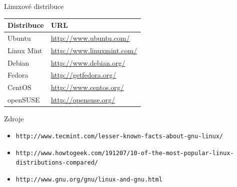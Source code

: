 \documentclass[pdf,slideColor,fyma]{prosper}
\begin{document}
\begin{slide}{Linuxové distribuce}
\begin{center}
\begin{tabular}{| l | l |} \hline
\textbf{Distribuce} & \textbf{URL}\\ \hline
Ubuntu & \url{http://www.ubuntu.com/} \\ \hline
Linux Mint & \url{http://www.linuxmint.com/} \\ \hline
Debian & \url{http://www.debian.org/} \\ \hline
Fedora & \url{http://getfedora.org/} \\ \hline
CentOS & \url{http://www.centos.org/} \\ \hline
openSUSE & \url{http://opensuse.org/} \\ \hline
\end{tabular}
\end{center}
\end{slide}

\begin{slide}{Zdroje}
\begin{itemize}
\item \texttt{http://www.tecmint.com/lesser-known-facts-about-gnu-linux/}
\item \texttt{http://www.howtogeek.com/191207/10-of-the-most-popular-linux-distributions-compared/}
\item \texttt{http://www.gnu.org/gnu/linux-and-gnu.html}
\end{itemize}
\end{slide}
\end{document}
